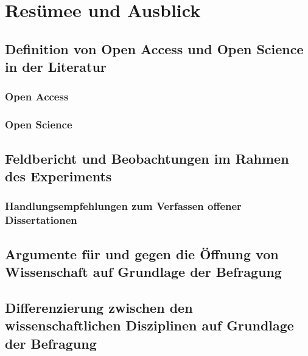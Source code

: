 \chapter{Resümee und Ausblick}

\section{Definition von Open Access und Open Science in der Literatur}
\subsection{Open Access}
\subsection{Open Science}
\section{Feldbericht und Beobachtungen im Rahmen des Experiments}
\subsection{Handlungsempfehlungen zum Verfassen offener Dissertationen}
\section{Argumente für und gegen die Öffnung von Wissenschaft auf Grundlage der Befragung}
\section{Differenzierung zwischen den wissenschaftlichen Disziplinen auf Grundlage der Befragung}
